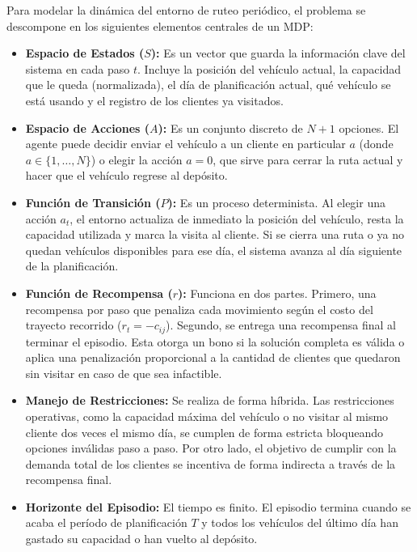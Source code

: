 Para modelar la dinámica del entorno de ruteo periódico, el problema se descompone en los siguientes elementos centrales de un MDP:

\begin{itemize}
    \item \textbf{Espacio de Estados ($S$):} Es un vector que guarda la información clave del sistema en cada paso $t$. Incluye la posición del vehículo actual, la capacidad que le queda (normalizada), el día de planificación actual, qué vehículo se está usando y el registro de los clientes ya visitados.

    \item \textbf{Espacio de Acciones ($A$):} Es un conjunto discreto de $N+1$ opciones. El agente puede decidir enviar el vehículo a un cliente en particular $a$ (donde $a \in \{1, \dots, N\}$) o elegir la acción $a=0$, que sirve para cerrar la ruta actual y hacer que el vehículo regrese al depósito.

    \item \textbf{Función de Transición ($P$):} Es un proceso determinista. Al elegir una acción $a_t$, el entorno actualiza de inmediato la posición del vehículo, resta la capacidad utilizada y marca la visita al cliente. Si se cierra una ruta o ya no quedan vehículos disponibles para ese día, el sistema avanza al día siguiente de la planificación.

    \item \textbf{Función de Recompensa ($r$):} Funciona en dos partes. Primero, una recompensa por paso que penaliza cada movimiento según el costo del trayecto recorrido ($r_t = -c_{ij}$). Segundo, se entrega una recompensa final al terminar el episodio. Esta otorga un bono si la solución completa es válida o aplica una penalización proporcional a la cantidad de clientes que quedaron sin visitar en caso de que sea infactible.

    \item \textbf{Manejo de Restricciones:} Se realiza de forma híbrida. Las restricciones operativas, como la capacidad máxima del vehículo o no visitar al mismo cliente dos veces el mismo día, se cumplen de forma estricta bloqueando opciones inválidas paso a paso. Por otro lado, el objetivo de cumplir con la demanda total de los clientes se incentiva de forma indirecta a través de la recompensa final.

    \item \textbf{Horizonte del Episodio:} El tiempo es finito. El episodio termina cuando se acaba el período de planificación $T$ y todos los vehículos del último día han gastado su capacidad o han vuelto al depósito.
\end{itemize}

